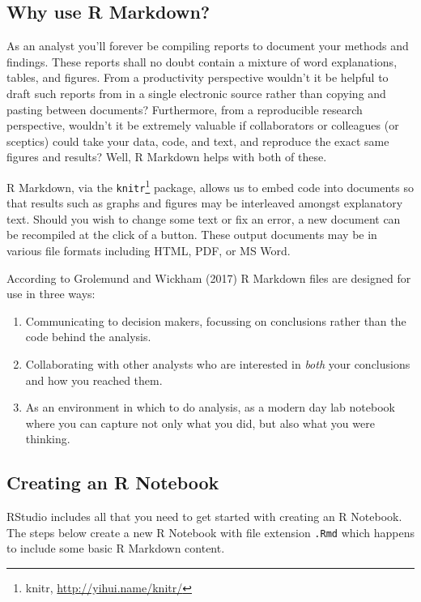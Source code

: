\documentclass[]{article}
\providecommand{\tightlist}{%
  \setlength{\itemsep}{0pt}\setlength{\parskip}{0pt}}
\let\rmarkdownfootnote\footnote%
\def\footnote{\protect\rmarkdownfootnote}
\begin{document}
\hypertarget{why-use-r-markdown}{%
\subsection{Why use R Markdown?}\label{why-use-r-markdown}}

As an analyst you'll forever be compiling reports to document your
methods and findings. These reports shall no doubt contain a mixture of
word explanations, tables, and figures. From a productivity perspective
wouldn't it be helpful to draft such reports from in a single electronic
source rather than copying and pasting between documents? Furthermore,
from a reproducible research perspective, wouldn't it be extremely
valuable if collaborators or colleagues (or sceptics) could take your
data, code, and text, and reproduce the exact same figures and results?
Well, R Markdown helps with both of these.

R Markdown, via the \texttt{knitr}\footnote{knitr,
  \url{http://yihui.name/knitr/}} package, allows us to embed code into
documents so that results such as graphs and figures may be interleaved
amongst explanatory text. Should you wish to change some text or fix an
error, a new document can be recompiled at the click of a button. These
output documents may be in various file formats including HTML, PDF, or
MS Word.

According to Grolemund and Wickham (2017) R Markdown files are designed
for use in three ways:

\begin{enumerate}
\def\labelenumi{\arabic{enumi}.}
\tightlist
\item
  Communicating to decision makers, focussing on conclusions rather than
  the code behind the analysis.
\item
  Collaborating with other analysts who are interested in \emph{both}
  your conclusions and how you reached them.
\item
  As an environment in which to do analysis, as a modern day lab
  notebook where you can capture not only what you did, but also what
  you were thinking.
\end{enumerate}

\hypertarget{creating-an-r-notebook}{%
\subsection{Creating an R Notebook}\label{creating-an-r-notebook}}

RStudio includes all that you need to get started with creating an R
Notebook. The steps below create a new R Notebook with file extension
\texttt{.Rmd} which happens to include some basic R Markdown content.
\end{document}
